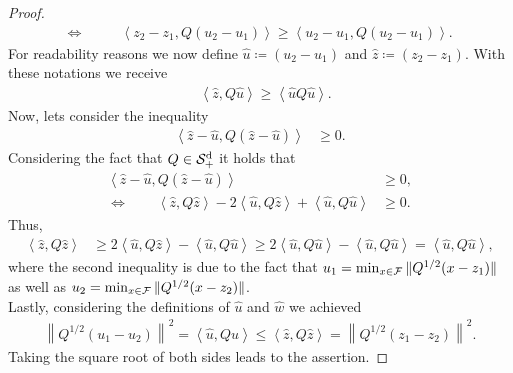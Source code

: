 \begin{proof}
\begin{align*}
\Longleftrightarrow \qquad &\left\langle z_2 - z_1, Q \left( u_2 - u_1 \right) \right\rangle \geq \left\langle u_2 - u_1, Q\left( u_2 - u_1 \right) \right\rangle.
\end{align*}
For readability reasons we now define $\hat{u} \coloneqq (u_2 - u_1)$ and $\hat{z} \coloneqq (z_2 - z_1)$. With these notations we receive
\begin{align*}
&\left \langle \hat{z}, Q \hat{u} \right\rangle \geq \left\langle \hat{u} Q\hat{u} \right\rangle.
\end{align*}
Now, lets consider the inequality
\begin{align*}
\left\langle \hat{z} - \hat{u}, Q\left(\hat{z} - \hat{u}\right) \right\rangle &\geq 0.
\end{align*}
Considering the fact that $Q\in\operatorname{\mathcal{S}^d_{+}}$ it holds that
\begin{align*}
\left\langle \hat{z} - \hat{u}, Q\left(\hat{z} - \hat{u}\right) \right\rangle &\geq 0,\\
\Longleftrightarrow \qquad \left\langle \hat{z}, Q\hat{z} \right\rangle - 2 \left\langle \hat{u}, Q\hat{z}\right\rangle + \left\langle \hat{u}, Q\hat{u} \right\rangle &\geq 0.
\end{align*}
Thus,
\begin{align*}
\left\langle \hat{z}, Q\hat{z} \right\rangle &\geq 2 \left\langle \hat{u}, Q\hat{z}\right\rangle - \left\langle \hat{u}, Q\hat{u} \right\rangle \geq 2 \left\langle \hat{u}, Q\hat{u} \right\rangle - \left\langle \hat{u}, Q\hat{u} \right\rangle = \left\langle \hat{u}, Q\hat{u} \right\rangle,
\end{align*}
where the second inequality is due to the fact that $u_1 = \min_{x\in\operatorname{\mathcal{F}}} \|Q^{1/2}(x-z_1)\|$ as well as $u_2 = \min_{x\in\operatorname{\mathcal{F}}} \|Q^{1/2}(x-z_2)\|$.\\
Lastly, considering the definitions of $\hat{u}$ and $\hat{w}$ we achieved
\begin{align*}
\left\| Q^{1/2} \left( u_1 - u_2 \right) \right\|^2 = \left\langle \hat{u}, Q \hat{u} \right\rangle \leq \left\langle \hat{z}, Q\hat{z} \right\rangle = \left\| Q^{1/2} \left( z_1 - z_2 \right) \right\|^2.
\end{align*}
Taking the square root of both sides leads to the assertion.
\end{proof}

